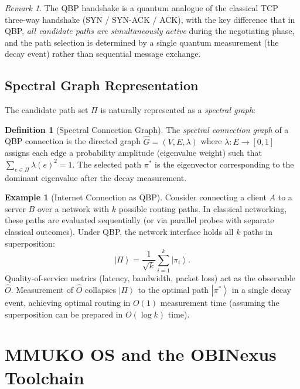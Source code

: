 \documentclass[12pt, a4paper]{article}
\theoremstyle{plain}
\theoremstyle{definition}
\newtheorem{definition}[theorem]{Definition}
\newtheorem{example}[theorem]{Example}
\theoremstyle{remark}
\newtheorem{remark}[theorem]{Remark}
\newcommand{\ket}[1]{\left| #1 \right\rangle}
\begin{document}
\begin{remark}
  The QBP handshake is a quantum analogue of the classical TCP three-way
  handshake (SYN / SYN-ACK / ACK), with the key difference that in QBP,
  \emph{all candidate paths are simultaneously active} during the negotiating
  phase, and the path selection is determined by a single quantum measurement
  (the decay event) rather than sequential message exchange.
\end{remark}

\subsection{Spectral Graph Representation}

The candidate path set $\Pi$ is naturally represented as a \emph{spectral
graph}:

\begin{definition}[Spectral Connection Graph]
  The \emph{spectral connection graph} of a QBP connection is the directed
  graph $\hat{G} = (V, E, \lambda)$ where $\lambda : E \to [0,1]$ assigns
  each edge a probability amplitude (eigenvalue weight) such that
  $\sum_{e \in \Pi} \lambda(e)^2 = 1$.  The selected path $\pi^*$ is the
  eigenvector corresponding to the dominant eigenvalue after the decay
  measurement.
\end{definition}

\begin{example}[Internet Connection as QBP]
  Consider connecting a client $A$ to a server $B$ over a network with $k$
  possible routing paths.  In classical networking, these paths are
  evaluated sequentially (or via parallel probes with separate classical
  outcomes).  Under QBP, the network interface holds all $k$ paths in
  superposition:
  \[
    \ket{\Pi} = \frac{1}{\sqrt{k}} \sum_{i=1}^k \ket{\pi_i}.
  \]
  Quality-of-service metrics (latency, bandwidth, packet loss) act as the
  observable $\hat{O}$.  Measurement of $\hat{O}$ collapses $\ket{\Pi}$ to
  the optimal path $\ket{\pi^*}$ in a single decay event, achieving optimal
  routing in $O(1)$ measurement time (assuming the superposition can be
  prepared in $O(\log k)$ time).
\end{example}

\section{MMUKO OS and the OBINexus Toolchain}
\label{sec:mmuko}
\end{document}
